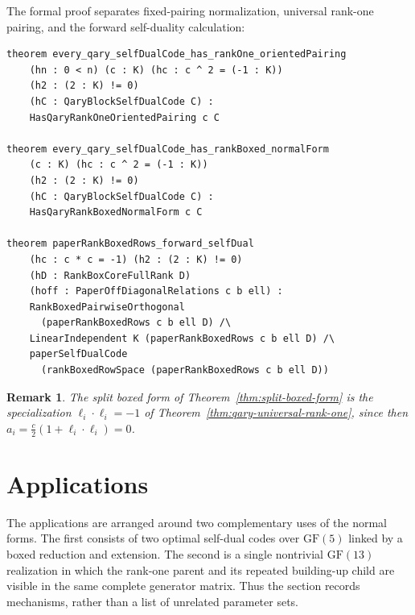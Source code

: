 \documentclass[12pt]{article}
\newtheorem{remark}[theorem]{Remark}
\newcommand{\GF}[1]{\ensuremath{\mathrm{GF}(#1)}}
\begin{document}
\noindent
The formal proof separates fixed-pairing normalization, universal rank-one
pairing, and the forward self-duality calculation:
\begin{lstlisting}[caption={Lean goals for Theorems~\ref{thm:qary-universal-rank-r} and~\ref{thm:qary-universal-rank-one}.}]
theorem every_qary_selfDualCode_has_rankOne_orientedPairing
    (hn : 0 < n) (c : K) (hc : c ^ 2 = (-1 : K))
    (h2 : (2 : K) != 0)
    (hC : QaryBlockSelfDualCode C) :
    HasQaryRankOneOrientedPairing c C

theorem every_qary_selfDualCode_has_rankBoxed_normalForm
    (c : K) (hc : c ^ 2 = (-1 : K))
    (h2 : (2 : K) != 0)
    (hC : QaryBlockSelfDualCode C) :
    HasQaryRankBoxedNormalForm c C

theorem paperRankBoxedRows_forward_selfDual
    (hc : c * c = -1) (h2 : (2 : K) != 0)
    (hD : RankBoxCoreFullRank D)
    (hoff : PaperOffDiagonalRelations c b ell) :
    RankBoxedPairwiseOrthogonal
      (paperRankBoxedRows c b ell D) /\
    LinearIndependent K (paperRankBoxedRows c b ell D) /\
    paperSelfDualCode
      (rankBoxedRowSpace (paperRankBoxedRows c b ell D))
\end{lstlisting}

\begin{remark}
\rm
The split boxed form of Theorem~\ref{thm:split-boxed-form} is the
specialization \(\ell_i\cdot\ell_i=-1\) of
Theorem~\ref{thm:qary-universal-rank-one}, since then
\(a_i=\frac c2(1+\ell_i\cdot\ell_i)=0\).
\end{remark}



  {}
  {}

\section{Applications}\label{sec:applications}

The applications are arranged around two complementary uses of the normal
forms.  The first consists of two optimal self-dual codes over \(\GF{5}\)
linked by a boxed reduction and extension.  The second is a single nontrivial
\(\GF{13}\) realization in which the rank-one parent and its repeated
building-up child are visible in the same complete generator matrix.  Thus
the section records mechanisms, rather than a list of unrelated parameter
sets.
\end{document}
